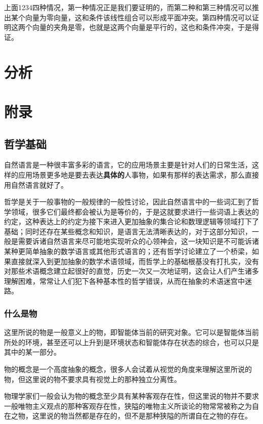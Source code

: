 \documentclass[12pt,oneside]{book}
\begin{document}
上面1234四种情况，第一种情况正是我们要证明的，而第二种和第三种情况可以推出某个向量为零向量，这和条件该线性组合可以形成平面冲突。第四种情况可以证明这两个向量的夹角是零，也就是这两个向量是平行的，这也和条件冲突，于是得证。

\part{分析}












\appendix

\part{附录}
\chapter{哲学基础}
自然语言是一种很丰富多彩的语言，它的应用场景主要是针对人们的日常生活，这样的应用场景更多地是要去表达\textbf{具体的}人事物，如果有那样的表达需求，那么直接用自然语言就好了。

哲学是关于一般事物的一般规律的一般性讨论，因此自然语言中的一些词汇到了哲学领域，很多它们最终都会被认为是等价的，于是这就要求进行一些词语上表达的约定，这种表达上的约定为接下来进入更加抽象的集合论和数理逻辑等领域打下了基础；同时还存在某些概念和知识，是语言无法清晰表达的，对于这部分知识，一般是需要诉诸自然语言来尽可能地实现听众的心领神会，这一块知识是不可能诉诸某种更简单抽象的数学语言或其他形式语言的；还有哲学讨论建立了一个桥梁，如果直接就深入到更加抽象的数学术语领域，而哲学上的基础根基没有打扎实，没有对那些术语概念建立起很好的直觉，历史一次又一次地证明，这会让人们产生诸多理解困难，常常让人们犯下各种基本性的哲学错误，从而在抽象的术语迷宫中迷路。



\section{什么是物}
这里所说的物是一般意义上的物，即智能体当前的研究对象。它可以是智能体当前所处的环境，甚至还可以上升到是环境状态和智能体存在状态的综合，也可以只是其中的某一部分。

物的概念是一个高度抽象的概念，很多人会试着从视觉的角度来理解这里所说的物，但这里说的物不要求具有视觉上的那种独立分离性。

物理学家们一般会认为物的概念至少具有某种客观存在性，但这里说的物并不要求一般唯物主义观点的那种客观存在性，狭隘的唯物主义所谈论的物常常被称之为自在之物，这里说的物当然都是存在的，但不是那种狭隘的所谓自在之物的存在。
\end{document}
